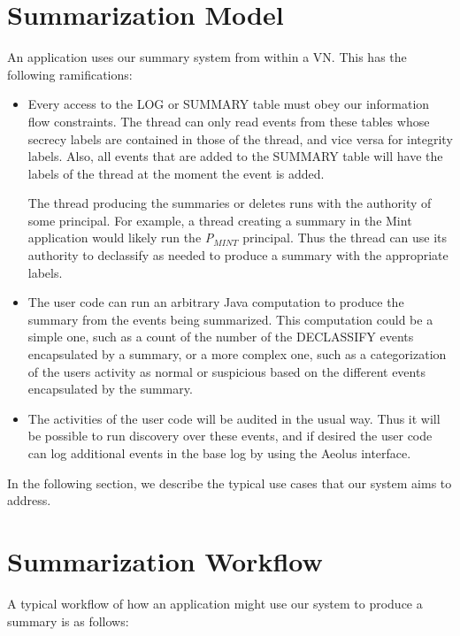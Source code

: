 \section{Summarization Model}

An application uses our summary system from within a VN. This has the following ramifications:

\begin{itemize}
  \item Every access to the LOG or SUMMARY table must obey our information flow constraints. The thread can only read events from these tables whose secrecy labels are contained in those of the thread, and vice versa for integrity labels. Also, all events that are added to the SUMMARY table will have the labels of the thread at the moment the event is added.

The thread producing the summaries or deletes runs with the authority of some principal. For example, a thread creating a summary in the Mint application would likely run the \emph{P$_{MINT}$} principal. Thus the thread can use its authority to declassify as needed to produce a summary with the appropriate labels.
  \item The user code can run an arbitrary Java computation to produce the summary from the events being summarized. This computation could be a simple one, such as a count of the number of the DECLASSIFY events encapsulated by a summary, or a more complex one, such as a categorization of the users activity as normal or suspicious based on the different events encapsulated by the summary.
  \item The activities of the user code will be audited in the usual way. Thus it will be possible to run discovery over these events, and if desired the user code can log additional events in the base log by using the Aeolus interface.
\end{itemize}

\noindent
In the following section, we describe the typical use cases that our system aims to address.

\section{Summarization Workflow}

A typical workflow of how an application might use our system to produce a summary is as follows:

